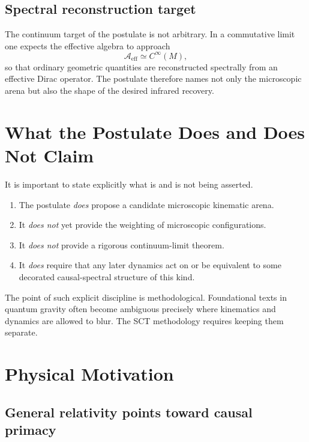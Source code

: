 \documentclass[12pt,a4paper]{article}
\theoremstyle{postulate}
\newcommand{\Alg}{\mathcal{A}}
\begin{document}
\subsection{Spectral reconstruction target}

The continuum target of the postulate is not arbitrary.  In a commutative
limit one expects the effective algebra to approach
\begin{equation}
  \Alg_{\mathrm{eff}} \simeq C^\infty(M),
  \label{eq:commutative}
\end{equation}
so that ordinary geometric quantities are reconstructed spectrally from an
effective Dirac operator.  The postulate therefore names not only the
microscopic arena but also the shape of the desired infrared recovery.

\section{What the Postulate Does and Does Not Claim}
\label{sec:nonclaims}

It is important to state explicitly what is and is not being asserted.

\begin{enumerate}[label=(\alph*)]
  \item The postulate \emph{does} propose a candidate microscopic kinematic
  arena.
  \item It \emph{does not} yet provide the weighting of microscopic
  configurations.
  \item It \emph{does not} provide a rigorous continuum-limit theorem.
  \item It \emph{does} require that any later dynamics act on or be
  equivalent to some decorated causal-spectral structure of this kind.
\end{enumerate}

The point of such explicit discipline is methodological.  Foundational texts
in quantum gravity often become ambiguous precisely where kinematics and
dynamics are allowed to blur.  The SCT methodology requires keeping them
separate.

\section{Physical Motivation}
\label{sec:motivation}

\subsection{General relativity points toward causal primacy}
\end{document}
